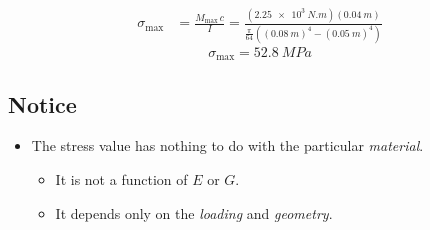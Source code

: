 \documentclass[11pt]{article}
\begin{document}
\begin{align*}
  \sigma_{\max} &= \frac{M_{\max}\,c}{I}
   = \frac{(\SI{2.25e3}{N.m})(\SI{0.04}{m})}
          {\frac{\pi}{64}\left((\SI{0.08}{m})^4 - (\SI{0.05}{m})^4\right)}
\end{align*}
\[
  \boxed{\sigma_{\max} = \SI{52.8}{MPa}}
\]

\subsection*{Notice}
\begin{itemize}
  \item The stress value has nothing to do with the particular \emph{material}.
  \begin{itemize}[label=\then]
    \item It is not a function of $E$ or $G$.
    \item It depends only on the \emph{loading} and \emph{geometry}.
  \end{itemize}
\end{itemize}
\end{document}
